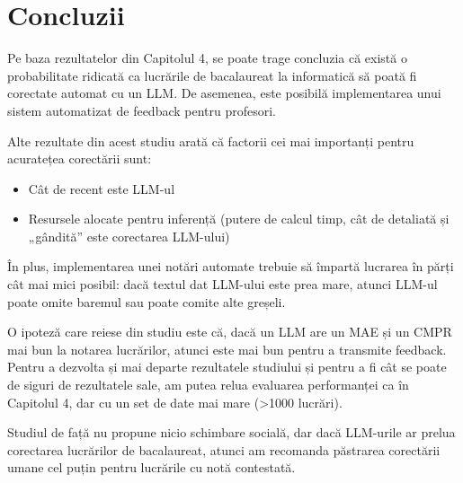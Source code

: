 \chapter{Concluzii}
Pe baza rezultatelor din Capitolul 4, se poate trage concluzia că există o probabilitate ridicată ca lucrările de bacalaureat la informatică să poată fi corectate automat cu un LLM. De asemenea, este posibilă implementarea unui sistem automatizat de feedback pentru profesori.

Alte rezultate din acest studiu arată că factorii cei mai importanți pentru acuratețea corectării sunt:
\begin{itemize}
\item Cât de recent este LLM-ul
\item Resursele alocate pentru inferență (putere de calcul \times timp, cât de detaliată și „gândită” este corectarea LLM-ului)
\end{itemize}

În plus, implementarea unei notări automate trebuie să împartă lucrarea în părți cât mai mici posibil: dacă textul dat LLM-ului este prea mare, atunci LLM-ul poate omite baremul sau poate comite alte greșeli.

O ipoteză care reiese din studiu este că, dacă un LLM are un MAE și un CMPR mai bun la notarea lucrărilor, atunci este mai bun pentru a transmite feedback. Pentru a dezvolta și mai departe rezultatele studiului și pentru a fi cât se poate de siguri de rezultatele sale, am putea relua evaluarea performanței ca în Capitolul 4, dar cu un set de date mai mare (>1000 lucrări).

Studiul de față nu propune nicio schimbare socială, dar dacă LLM-urile ar prelua corectarea lucrărilor de bacalaureat, atunci am recomanda păstrarea corectării umane cel puțin pentru lucrările cu notă contestată.